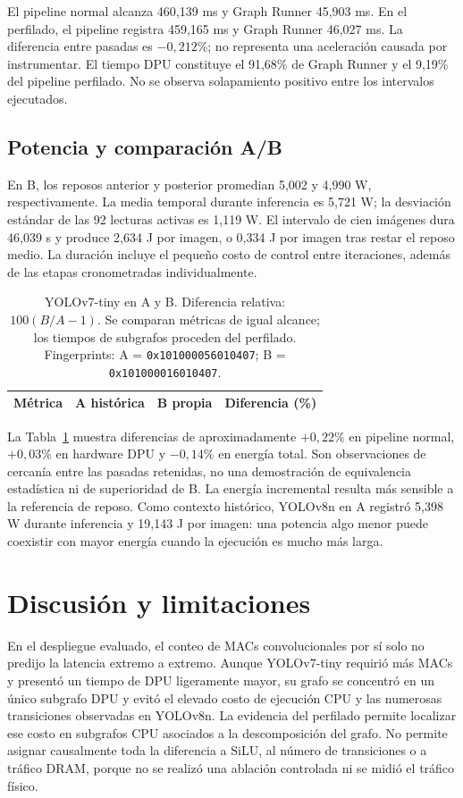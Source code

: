 \documentclass[10pt,conference,a4paper]{elektron}
\newcommand{\fpA}{\texttt{0x101000056010407}}
\newcommand{\fpB}{\texttt{0x101000016010407}}
\begin{document}
El pipeline normal alcanza 460,139 ms y Graph Runner 45,903 ms. En el perfilado, el pipeline registra 459,165 ms y Graph Runner 46,027 ms. La diferencia entre pasadas es $-0,212$\%; no representa una aceleración causada por instrumentar. El tiempo DPU constituye el 91,68\% de Graph Runner y el 9,19\% del pipeline perfilado. No se observa solapamiento positivo entre los intervalos ejecutados.

\subsection{Potencia y comparación A/B}
En B, los reposos anterior y posterior promedian 5,002 y 4,990 W, respectivamente. La media temporal durante inferencia es 5,721 W; la desviación estándar de las 92 lecturas activas es 1,119 W. El intervalo de cien imágenes dura 46,039 s y produce 2,634 J por imagen, o 0,334 J por imagen tras restar el reposo medio. La duración incluye el pequeño costo de control entre iteraciones, además de las etapas cronometradas individualmente.

\begin{table}[t]\caption{YOLOv7-tiny en A y B. Diferencia relativa: $100(B/A-1)$. Se comparan métricas de igual alcance; los tiempos de subgrafos proceden del perfilado. Fingerprints: A = \fpA; B = \fpB.}\label{tab:ab}
\centering\small\begin{tabular}{lrrr}\toprule
Métrica & A histórica & B propia & Diferencia (\%)\\\midrule
\bottomrule\end{tabular}\end{table}

La Tabla~\ref{tab:ab} muestra diferencias de aproximadamente $+0,22$\% en pipeline normal, $+0,03$\% en hardware DPU y $-0,14$\% en energía total. Son observaciones de cercanía entre las pasadas retenidas, no una demostración de equivalencia estadística ni de superioridad de B. La energía incremental resulta más sensible a la referencia de reposo. Como contexto histórico, YOLOv8n en A registró 5,398 W durante inferencia y 19,143 J por imagen: una potencia algo menor puede coexistir con mayor energía cuando la ejecución es mucho más larga.

\section{Discusión y limitaciones}
En el despliegue evaluado, el conteo de MACs convolucionales por sí solo no predijo la latencia extremo a extremo. Aunque YOLOv7-tiny requirió más MACs y presentó un tiempo de DPU ligeramente mayor, su grafo se concentró en un único subgrafo DPU y evitó el elevado costo de ejecución CPU y las numerosas transiciones observadas en YOLOv8n. La evidencia del perfilado permite localizar ese costo en subgrafos CPU asociados a la descomposición del grafo. No permite asignar causalmente toda la diferencia a SiLU, al número de transiciones o a tráfico DRAM, porque no se realizó una ablación controlada ni se midió el tráfico físico.
\end{document}
